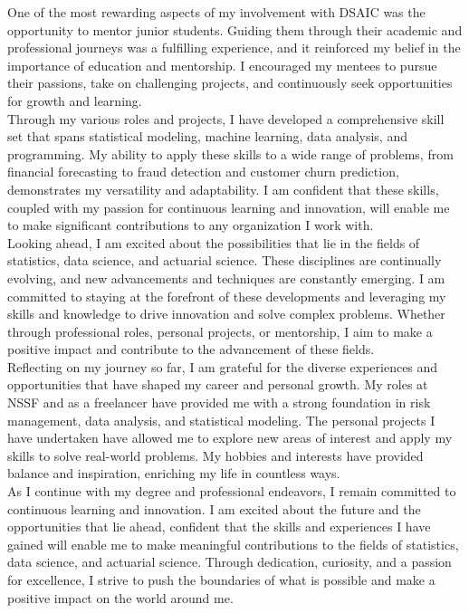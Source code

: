 \documentclass[12pt,a4paper,sans,english]{report}
\begin{document}
\noindent One of the most rewarding aspects of my involvement with DSAIC was the opportunity to mentor junior students. Guiding them through their academic and professional journeys was a fulfilling experience, and it reinforced my belief in the importance of education and mentorship. I encouraged my mentees to pursue their passions, take on challenging projects, and continuously seek opportunities for growth and learning.\\

\noindent Through my various roles and projects, I have developed a comprehensive skill set that spans statistical modeling, machine learning, data analysis, and programming. My ability to apply these skills to a wide range of problems, from financial forecasting to fraud detection and customer churn prediction, demonstrates my versatility and adaptability. I am confident that these skills, coupled with my passion for continuous learning and innovation, will enable me to make significant contributions to any organization I work with.\\

\noindent Looking ahead, I am excited about the possibilities that lie in the fields of statistics, data science, and actuarial science. These disciplines are continually evolving, and new advancements and techniques are constantly emerging. I am committed to staying at the forefront of these developments and leveraging my skills and knowledge to drive innovation and solve complex problems. Whether through professional roles, personal projects, or mentorship, I aim to make a positive impact and contribute to the advancement of these fields.\\

\noindent Reflecting on my journey so far, I am grateful for the diverse experiences and opportunities that have shaped my career and personal growth. My roles at NSSF and as a freelancer have provided me with a strong foundation in risk management, data analysis, and statistical modeling. The personal projects I have undertaken have allowed me to explore new areas of interest and apply my skills to solve real-world problems. My hobbies and interests have provided balance and inspiration, enriching my life in countless ways.\\

\noindent As I continue with my degree and professional endeavors, I remain committed to continuous learning and innovation. I am excited about the future and the opportunities that lie ahead, confident that the skills and experiences I have gained will enable me to make meaningful contributions to the fields of statistics, data science, and actuarial science. Through dedication, curiosity, and a passion for excellence, I strive to push the boundaries of what is possible and make a positive impact on the world around me.\\
\end{document}
